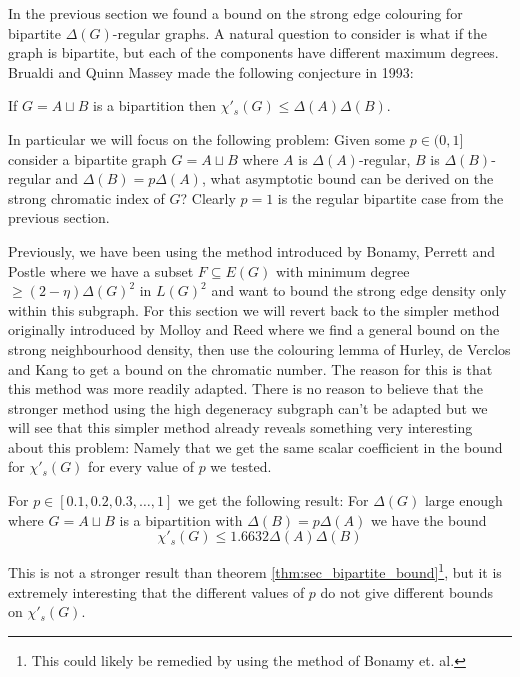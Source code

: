 In the previous section we found a bound on the strong edge colouring for bipartite
$\Delta(G)$-regular graphs. A natural question to consider is what if the graph
is bipartite, but each of the components have different maximum degrees.
Brualdi and Quinn Massey made the following conjecture
in 1993:

\begin{knownconjecture}
    If $G=A \sqcup B$ is a bipartition then
    $\chi'_s(G) \leq \Delta(A)\Delta(B)$.
\end{knownconjecture}

In particular we will focus on the following problem: Given some
$p\in (0, 1]$ consider a bipartite graph
$G=A \sqcup B$ where $A$ is $\Delta(A)$-regular, $B$ is $\Delta(B)$-regular
and $\Delta(B) = p\Delta(A)$, what asymptotic bound can be derived on the strong chromatic
index of $G$? Clearly $p=1$ is the regular bipartite case from the previous section.

Previously, we have been using the method introduced by Bonamy, Perrett and Postle
\cite{bonamyColouringGraphsSparse2018} where we have a subset $F\subseteq E(G)$ 
with minimum degree $\geq (2-\eta)\Delta(G)^2$ in $L(G)^2$ and want to bound the
strong edge density only within this subgraph. For this section we will revert back
to the simpler method originally introduced by Molloy and Reed
\cite{molloyBoundStrongChromatic1997} where we find a general bound on the strong
neighbourhood density, then use the colouring lemma of Hurley, de Verclos and Kang
\cite{hurleyImprovedProcedureColouring2022} to get a bound on the chromatic number.
The reason for this is that this method was more readily adapted. There is no reason
to believe that the stronger method using the high degeneracy subgraph can't be adapted
but we will see that this simpler method already reveals something very interesting about this
problem: Namely that we get the same scalar coefficient in the bound for 
$\chi'_s(G)$ for every value of $p$ we tested.

\begin{theorem}
    \label{thm:asymmetric_bipartite_bound}
    For $p\in [0.1, 0.2, 0.3, \dots, 1]$ we get the following result:
    For $\Delta(G)$ large enough where $G=A\sqcup B$ is a bipartition with
    $\Delta(B)=p\Delta(A)$ we have the bound
    \[
        \chi'_s(G) \leq 1.6632 \Delta(A)\Delta(B)
    \]
\end{theorem}

This is not a stronger result than theorem \ref{thm:sec_bipartite_bound}\footnote{This could likely
be remedied by using the method of Bonamy et. al.},
but it is extremely interesting that the different values of $p$ do not give different bounds on
$\chi'_s(G)$.


